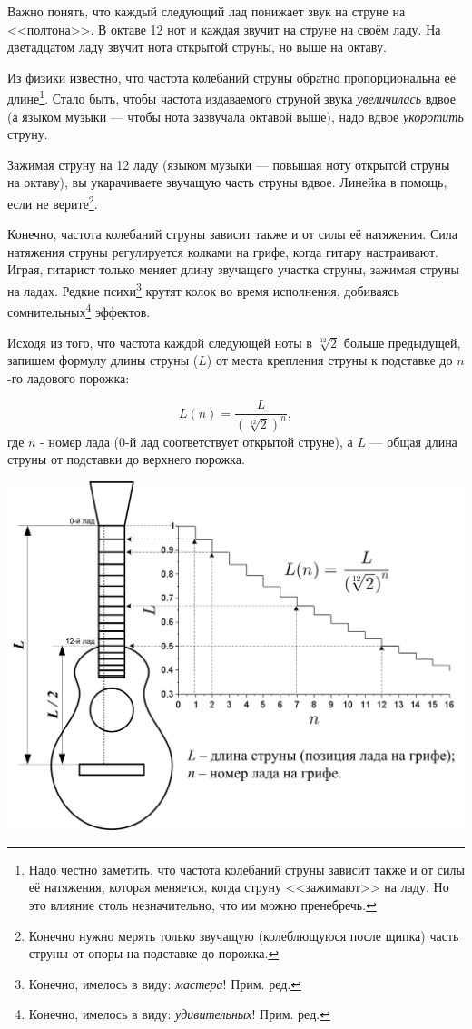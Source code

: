 Важно понять, что каждый следующий лад понижает звук на струне на <<полтона>>. В октаве 12 нот и каждая звучит на струне на своём ладу. На дветадцатом ладу звучит нота открытой струны, но выше на октаву.

Из физики известно, что частота колебаний струны обратно пропорциональна её длине\footnote{Надо честно заметить, что частота колебаний струны зависит также и от силы её натяжения, которая меняется, когда струну <<зажимают>> на ладу. Но это влияние столь незначительно, что им можно пренебречь.}. Стало быть, чтобы частота издаваемого струной звука \emph{увеличилась} вдвое (а языком музыки --- чтобы нота зазвучала октавой выше), надо вдвое \emph{укоротить} струну. 

Зажимая струну на 12 ладу (языком музыки --- повышая ноту открытой струны на октаву), вы укарачиваете звучащую часть струны вдвое. Линейка в помощь, если не верите\footnote{Конечно нужно мерять только звучащую (колеблющуюся после щипка) часть струны от опоры на подставке до порожка.}.

Конечно, частота колебаний струны зависит также и от силы её натяжения. Сила натяжения струны регулируется колками на грифе, когда гитару настраивают. Играя, гитарист только меняет длину звучащего участка струны, зажимая струны на ладах. Редкие психи\footnote{Конечно, имелось в виду: \emph{мастера}! Прим. ред.} крутят колок во время исполнения, добиваясь сомнительных\footnote{Конечно, имелось в виду: \emph{удивительных}! Прим. ред.} эффектов.

Исходя из того, что частота каждой следующей ноты в $\sqrt[12]{2}$ больше предыдущей, запишем формулу длины струны ($L$) от места крепления струны к подставке до $n$-го ладового порожка:

\[L(n)=\frac{L}{(\sqrt[12]{2})^n},\]
где $n$ - номер лада ($0$-й лад соответствует открытой струне), а $L$ --- общая длина струны от подставки до верхнего порожка.


\includegraphics{fig/string-length.png}


